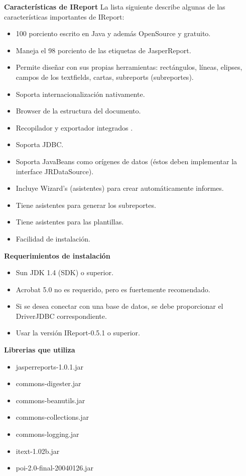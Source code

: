 	\textbf{Características de IReport}
	La lista siguiente describe algunas de las características importantes de IReport:
	\begin{itemize}
		\item 100 porciento escrito en Java y además OpenSource y gratuito.
		\item Maneja el 98 porciento de las etiquetas de JasperReport.
		\item Permite diseñar con sus propias herramientas: rectángulos, líneas, elipses, campos de los textfields, cartas, subreports (subreportes).
		\item Soporta internacionalización nativamente.
		\item Browser de la estructura del documento.
		\item Recopilador y exportador integrados .
		\item Soporta JDBC.
		\item Soporta JavaBeans como orígenes de datos (éstos deben implementar la interface JRDataSource).
		\item Incluye Wizard’s (asistentes) para crear automáticamente informes.
		\item Tiene asistentes para generar los subreportes.
		\item Tiene asistentes para las plantillas.
		\item Facilidad de instalación.
	\end{itemize}

	\textbf{Requerimientos de instalación}
	\begin{itemize}
		\item Sun JDK 1.4 (SDK) o superior.
		\item Acrobat 5.0 no es requerido, pero es fuertemente recomendado.
		\item Si se desea conectar con una base de datos, se debe proporcionar el DriverJDBC correspondiente.
		\item Usar la versión IReport-0.5.1 o superior.
	\end{itemize}

	\textbf{Librerias que utiliza}
		\begin{itemize}
			\item jasperreports-1.0.1.jar
			\item commons-digester.jar
			\item commons-beanutils.jar
			\item commons-collections.jar
			\item commons-logging.jar
			\item itext-1.02b.jar
			\item poi-2.0-final-20040126.jar
		\end{itemize}
	
